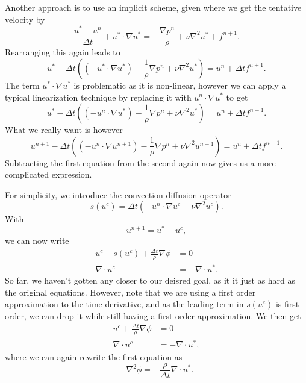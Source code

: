 Another approach is to use an implicit scheme, given where we get the tentative velocity by
\begin{equation}
    \frac{u^* - u^n}{\Delta t} + u^* \cdot \nabla u^* = -\frac{\nabla p^n}{\rho} + \nu \nabla^2 u^* + f^{n + 1}.
\end{equation}
Rearranging this again leads to
\begin{equation}
    u^* - \Delta t \left(
        (-u^* \cdot \nabla u^*)
        - \frac{1}{\rho} \nabla p^n
        + \nu \nabla^2 u^*
    \right)
    = u^n + \Delta t f^{n + 1}.
\end{equation}
The term $u^* \cdot \nabla u^*$ is problematic as it is non-linear, however we can apply a typical linearization technique by replacing it with $u^n \cdot \nabla u^*$ to get
\begin{equation}
    u^* - \Delta t \left(
        (-u^n \cdot \nabla u^*)
        - \frac{1}{\rho} \nabla p^n
        + \nu \nabla^2 u^*
    \right)
    = u^n + \Delta t f^{n + 1}.
\end{equation}
What we really want is however
\begin{equation}
    u^{n + 1} - \Delta t \left(
        (-u^{n} \cdot \nabla u^{n + 1})
        - \frac{1}{\rho} \nabla p^n
        + \nu \nabla^2 u^{n + 1}
    \right)
    = u^n + \Delta t f^{n + 1}.
\end{equation}
Subtracting the first equation from the second again now gives us a more complicated expression.

For simplicity, we introduce the convection-diffusion operator
\begin{equation}
    s(u^c) = \Delta t \left( -u^n \cdot \nabla u^c + \nu \nabla^2 u^c \right).
\end{equation}
With
\begin{equation}
    u^{n+1} = u^* + u^c,
\end{equation}
we can now write
\begin{equation}
    \begin{split}
        u^c - s(u^c) + \frac{\Delta t}{\rho}\nabla \phi &= 0 \\
        \nabla \cdot u^c &= - \nabla \cdot u^*.
    \end{split}
\end{equation}
So far, we haven't gotten any closer to our deisred goal, as it it just as hard as the original equations.
However, note that we are using a first order approximation to the time derivative, and as the leading term in $s(u^c)$ is first order, we can drop it while still having a first order approximation.
We then get
\begin{equation}
    \begin{split}
        u^c + \frac{\Delta t}{\rho} \nabla \phi &= 0 \\
        \nabla \cdot u^c &= -\nabla \cdot u^*,
    \end{split}
\end{equation}
where we can again rewrite the first equation as
\begin{equation}
    -\nabla^2 \phi = - \frac{\rho}{\Delta t} \nabla \cdot u^*.
\end{equation}

